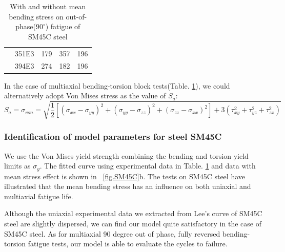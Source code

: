 \documentclass[3p,times,number,review]{elsarticle}
\newcommand{\figref}[1]{\figurename~\ref{#1}}
\begin{document}
\begin{table}[!h]
\begin{tabularx}{\textwidth}{XXXXX}
& 351E3                                                                                 & 179                                                                                       & 357                                                                                         & 196                                                                                         \\
& 394E3                                                                                 & 274                                                                                       & 182                                                                                         & 196                                                                                         \\ \hline
\end{tabularx}
\caption{With and without mean bending stress on out-of-phase($90^\circ$) fatigue of SM45C steel \cite{lee2013out}}
\label{meanSM45C}
\end{table}

In the case of multiaxial bending-torsion block tests(Table. \ref{meanSM45C}), we could alternatively adopt Von Mises stress as the value of $S_{a}$:
\begin{equation}
S_{a}=\sigma_{von}=\sqrt{\frac{1}{2}\left[ (\sigma_{xx}-\sigma_{yy})^2+(\sigma_{yy}-\sigma_{zz})^2+(\sigma_{zz}-\sigma_{xx})^2\right]+3(\tau_{xy}^2+\tau_{yz}^2+\tau_{zx}^2) }
\label{von}
\end{equation}

\newpage
\subsubsection{Identification of model parameters for steel SM45C}

We use the Von Mises yield strength combining the bending and torsion yield limits as $\sigma_y$. The fitted curve using experimental data in Table. \ref{meanSM45C} and data with mean stress effect is shown in \figref{fig.SM45C}b.
The tests on SM45C steel have illustrated that the mean bending stress has an influence on both uniaxial and multiaxial fatigue life. 

Although the uniaxial experimental data we extracted from Lee's curve \cite{lee2013out} of SM45C steel are slightly dispersed, we can find our model quite satisfactory in the case of SM45C steel. As for multiaxial 90 degree out of phase, fully reversed bending-torsion fatigue tests, our model is able to evaluate the cycles to failure.
\end{document}
